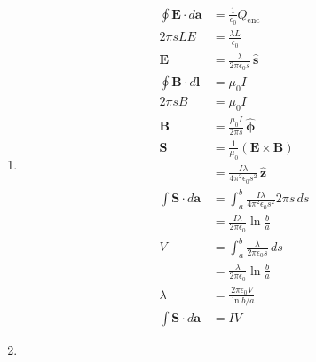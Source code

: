 \documentclass{article}
\renewcommand{\vec}[1]{\boldsymbol{\mathbf{#1}}}
\newcommand{\uvec}[1]{\hat{\vec{#1}}}
\begin{document}
\begin{enumerate}
  \item

        \begin{align*}
          \oint \vec{E} \cdot d \vec{a} & = \frac{1}{\epsilon_0} Q_\text{enc}                               \\
          2 \pi s L E                   & = \frac{\lambda L}{\epsilon_0}                                    \\
          \vec{E}                       & = \frac{\lambda}{2 \pi \epsilon_0 s} \,\uvec{s}                   \\
          \oint \vec{B} \cdot d \vec{l} & = \mu_0 I                                                         \\
          2 \pi s B                     & = \mu_0 I                                                         \\
          \vec{B}                       & = \frac{\mu_0 I}{2 \pi s} \,\uvec{\phi}                           \\
          \vec{S}                       & = \frac{1}{\mu_0} (\vec{E} \times \vec{B})                        \\
                                        & = \frac{I \lambda}{4 \pi^2 \epsilon_0 s^2} \,\uvec{z}             \\
          \int \vec{S} \cdot d \vec{a}  & = \int_a^b \frac{I \lambda}{4 \pi^2 \epsilon_0 s^2} 2 \pi s \,d s \\
                                        & = \frac{I \lambda}{2 \pi \epsilon_0} \ln \frac{b}{a}              \\
          V                             & = \int_a^b \frac{\lambda}{2 \pi \epsilon_0 s} \,d s               \\
                                        & = \frac{\lambda}{2 \pi \epsilon_0} \ln \frac{b}{a}                \\
          \lambda                       & = \frac{2 \pi \epsilon_0 V}{\ln b / a}                            \\
          \int \vec{S} \cdot d \vec{a}  & = I V
        \end{align*}

  \item


\end{enumerate}
\end{document}
